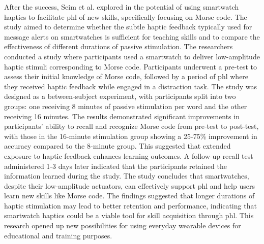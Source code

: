 After the success, Seim et al. explored in \cite{Seim2018} the potential of using smartwatch haptics to facilitate \gls{phl} of new skills, specifically focusing on Morse code. The study aimed to determine whether the subtle haptic feedback typically used for message alerts on smartwatches is sufficient for teaching skills and to compare the effectiveness of different durations of passive stimulation.
The researchers conducted a study where participants used a smartwatch to deliver low-amplitude haptic stimuli corresponding to Morse code. Participants underwent a pre-test to assess their initial knowledge of Morse code, followed by a period of \gls{phl} where they received haptic feedback while engaged in a distraction task. The study was designed as a between-subject experiment, with participants split into two groups: one receiving 8 minutes of passive stimulation per word and the other receiving 16 minutes.
The results demonstrated significant improvements in participants' ability to recall and recognize Morse code from pre-test to post-test, with those in the 16-minute stimulation group showing a 25-75\% improvement in accuracy compared to the 8-minute group. This suggested that extended exposure to haptic feedback enhances learning outcomes. A follow-up recall test administered 1-3 days later indicated that the participants retained the information learned during the study.
The study concludes that smartwatches, despite their low-amplitude actuators, can effectively support \gls{phl} and help users learn new skills like Morse code. The findings suggested that longer durations of haptic stimulation may lead to better retention and performance, indicating that smartwatch haptics could be a viable tool for skill acquisition through \gls{phl}. This research opened up new possibilities for using everyday wearable devices for educational and training purposes.


